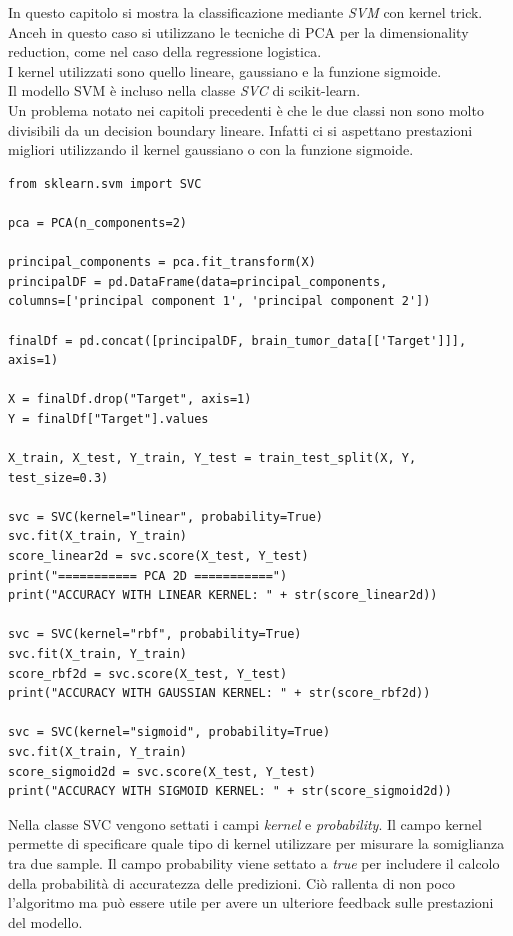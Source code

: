 In questo capitolo si mostra la classificazione mediante \textit{SVM} con kernel trick.\\
Anceh in questo caso si utilizzano le tecniche di PCA per la dimensionality reduction, come nel caso della regressione logistica.\\
I kernel utilizzati sono quello lineare, gaussiano e la funzione sigmoide.\\
Il modello SVM è incluso nella classe \textit{SVC} di scikit-learn.\\
Un problema notato nei capitoli precedenti è che le due classi non sono molto divisibili da un decision boundary lineare. Infatti ci si aspettano prestazioni migliori utilizzando il kernel gaussiano o con la funzione sigmoide.
\begin{lstlisting}
from sklearn.svm import SVC

pca = PCA(n_components=2)

principal_components = pca.fit_transform(X)
principalDF = pd.DataFrame(data=principal_components,
columns=['principal component 1', 'principal component 2'])

finalDf = pd.concat([principalDF, brain_tumor_data[['Target']]], axis=1)

X = finalDf.drop("Target", axis=1)
Y = finalDf["Target"].values

X_train, X_test, Y_train, Y_test = train_test_split(X, Y, test_size=0.3)

svc = SVC(kernel="linear", probability=True)
svc.fit(X_train, Y_train)
score_linear2d = svc.score(X_test, Y_test)
print("=========== PCA 2D ===========")
print("ACCURACY WITH LINEAR KERNEL: " + str(score_linear2d))

svc = SVC(kernel="rbf", probability=True)
svc.fit(X_train, Y_train)
score_rbf2d = svc.score(X_test, Y_test)
print("ACCURACY WITH GAUSSIAN KERNEL: " + str(score_rbf2d))

svc = SVC(kernel="sigmoid", probability=True)
svc.fit(X_train, Y_train)
score_sigmoid2d = svc.score(X_test, Y_test)
print("ACCURACY WITH SIGMOID KERNEL: " + str(score_sigmoid2d))
\end{lstlisting}
Nella classe SVC vengono settati i campi \textit{kernel} e \textit{probability}. Il campo kernel permette di specificare quale tipo di kernel utilizzare per misurare la somiglianza tra due sample. Il campo probability viene settato a \textit{true} per includere il calcolo della probabilità di accuratezza delle predizioni. Ciò rallenta di non poco l'algoritmo ma può essere utile per avere un ulteriore feedback sulle prestazioni del modello.\\
